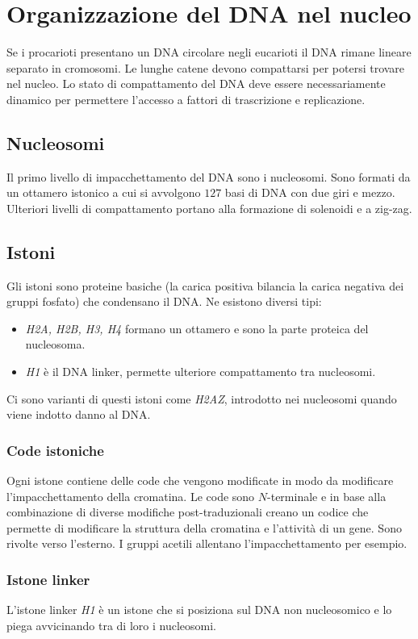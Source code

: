 \section{Organizzazione del DNA nel nucleo}
Se i procarioti presentano un DNA circolare negli eucarioti il DNA rimane lineare separato in cromosomi. 
Le lunghe catene devono compattarsi per potersi trovare nel nucleo. 
Lo stato
di compattamento del DNA deve essere necessariamente dinamico per permettere l'accesso a fattori di trascrizione e replicazione. 

	
	\subsection{Nucleosomi}
	Il primo livello di impacchettamento del DNA sono i nucleosomi.
	Sono formati da un ottamero istonico a cui si avvolgono $127$ basi di DNA con due giri e mezzo.
	Ulteriori livelli di compattamento portano alla formazione di solenoidi e a zig-zag.

	\subsection{Istoni}
	Gli istoni sono proteine basiche (la carica positiva bilancia la carica negativa dei gruppi fosfato) che condensano il DNA.
	Ne esistono diversi tipi:
	\begin{itemize}
		\item \emph{H2A, H2B, H3, H4} formano un ottamero e sono la parte proteica del nucleosoma.
		\item \emph{H1} \`e il DNA linker, permette ulteriore compattamento tra nucleosomi.
	\end{itemize}
	Ci sono varianti di questi istoni come \emph{H2AZ}, introdotto nei nucleosomi quando viene indotto danno al DNA.
		
		\subsubsection{Code istoniche}
		Ogni istone contiene delle code che vengono modificate in modo da modificare l'impacchettamento della cromatina.
		Le code sono $N$-terminale e in base alla combinazione di diverse modifiche post-traduzionali creano un codice che permette di modificare la struttura della cromatina e l'attivit\`a di un gene.
		Sono rivolte verso l'esterno.
		I gruppi acetili allentano l'impacchettamento per esempio.

		\subsubsection{Istone linker}
		L'istone linker \emph{H1} \`e un istone che si posiziona sul DNA non nucleosomico e lo piega avvicinando tra di loro i nucleosomi.

